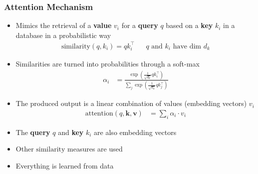 \documentclass[10pt]{beamer}
\begin{document}
\begin{frame}
  \frametitle{Attention Mechanism}
 
\begin{itemize}[<+->]
\item Mimics the retrieval of a \textbf{value} $v_i$ for a \textbf{query} $q$
based on a \textbf{key} $k_i$ in a database in a probabilistic way
\begin{align*}
\text{similarity}(q,k_i) = q k_i^\top
& & \text{$q$ and $k_i$ have dim $d_k$}
\end{align*}
\item Similarities are turned into probabilities through a soft-max
\begin{align*}
\alpha_i & = \frac{\exp(\frac{1}{\sqrt{d_k}} q k_i^\top)}{\sum_j \exp(\frac{1}{\sqrt{d_k}}q k_j^\top)}
\end{align*}
\item The produced output is a linear combination of values (embedding vectors) $v_i$
\begin{align*}
\text{attention}(q,\textbf{k},\textbf{v}) & = \sum_i \alpha_i \cdot v_i
\end{align*}
\item The \textbf{query} $q$ and \textbf{key} $k_i$ are also embedding vectors
\item Other $\text{similarity}$ measures are used
\item Everything is learned from data
\end{itemize}
\end{frame}
\end{document}
